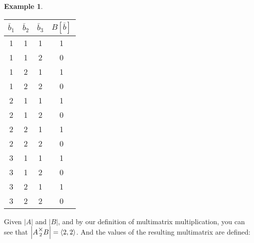 \documentclass[12pt]{book}
\theoremstyle{plain}
\theoremstyle{definition}
\newtheorem{example}{Example}[chapter]
\theoremstyle{ppart}
\theoremstyle{case}
\theoremstyle{solution}
\newcommand{\mmult}[1]{\text{\raisebox{1ex}{$\underset{#1}{\times}$}}}
\newcommand{\shape}[1]{\left|#1\right|}
\begin{document}
\begin{example}
\begin{table}[h!]
\begin{center}
\begin{tabular}{c c c | c}
$\bar{b}_1$ & $\bar{b}_2$ & $\bar{b}_3$ & $B[\bar{b}]$ \\
\hline
1           & 1           & 1           & 1            \\
1           & 1           & 2           & 0            \\
1           & 2           & 1           & 1            \\
1           & 2           & 2           & 0            \\
2           & 1           & 1           & 1            \\
2           & 1           & 2           & 0            \\
2           & 2           & 1           & 1            \\
2           & 2           & 2           & 0            \\
3           & 1           & 1           & 1            \\
3           & 1           & 2           & 0            \\
3           & 2           & 1           & 1            \\
3           & 2           & 2           & 0
\end{tabular}
\end{center}
\end{table}

Given $\shape{A}$ and $\shape{B}$, and by our definition of multimatrix multiplication,
you can see that $\shape{A \mmult{2} B} = \left<2, 2\right>$. And the values of the
resulting multimatrix are defined:


\end{example}
\end{document}
